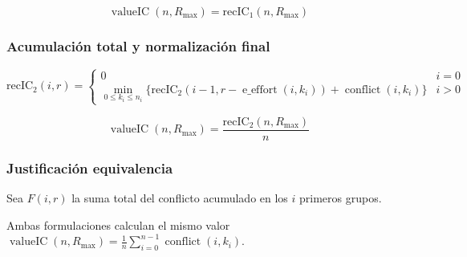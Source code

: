 \begin{equation}
	\operatorname{ valueIC }(n,R_{ \max }) = \operatorname{ { recIC }_1 }(n,R_{ \max })
\end{equation}

\subsubsection{Acumulación total y normalización final}

\begin{equation}
	\operatorname{ { recIC }_2 }(i,r) = \begin{cases}
		0                                                                                                                                             & i = 0 \\
		\min_{ 0 \leq k_i \leq n_i } \{\operatorname{ { recIC }_2 }(i - 1,r - \operatorname{ e\_effort }(i,k_i)) + \operatorname{ conflict }(i,k_i)\} & i > 0
	\end{cases}
\end{equation}

\begin{equation}
	\operatorname{ valueIC }(n,R_{ \max }) = \frac{ \operatorname{ { recIC }_2 }(n,R_{ \max }) }{ n }
\end{equation}

\subsubsection{Justificación equivalencia}

Sea $F(i,r)$ la suma total del conflicto acumulado en los $i$ primeros grupos.

Ambas formulaciones calculan el mismo valor $\operatorname{ valueIC }(n,R_{ \max }) = \frac{ 1 }{ n } \sum_{ i = 0 }^{ n - 1 } \operatorname{ conflict }(i,k_i)$.

